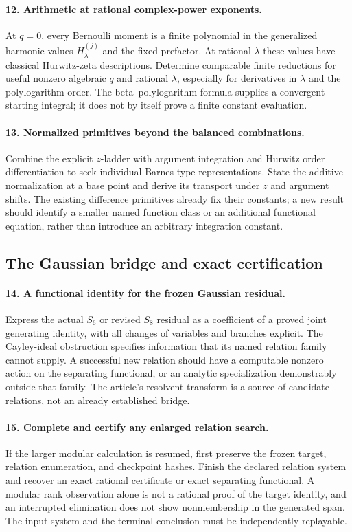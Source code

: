 \paragraph{12. Arithmetic at rational complex-power exponents.}
At $q=0$, every Bernoulli moment is a finite polynomial in the
generalized harmonic values $H_\lambda^{(j)}$ and the fixed
prefactor. At rational $\lambda$ these values have classical
Hurwitz-zeta descriptions. Determine comparable finite reductions
for useful nonzero algebraic $q$ and rational $\lambda$, especially
for derivatives in $\lambda$ and the polylogarithm order.
The beta--polylogarithm formula supplies a convergent starting
integral; it does not by itself prove a finite constant evaluation.

\paragraph{13. Normalized primitives beyond the balanced combinations.}
Combine the explicit $z$-ladder with argument integration and
Hurwitz order differentiation to seek individual Barnes-type
representations. State the additive normalization at a base point
and derive its transport under $z$ and argument shifts. The
existing difference primitives already fix their constants; a
new result should identify a smaller named function class or an
additional functional equation, rather than introduce an arbitrary
integration constant.

\subsection{The Gaussian bridge and exact certification}

\paragraph{14. A functional identity for the frozen Gaussian residual.}
Express the actual $S_6$ or revised $S_8$ residual as a coefficient
of a proved joint generating identity, with all changes of
variables and branches explicit. The Cayley-ideal obstruction
specifies information that its named relation family cannot
supply. A successful new relation should have a computable
nonzero action on the separating functional, or an analytic
specialization demonstrably outside that family. The article's
resolvent transform is a source of candidate relations, not an
already established bridge.

\paragraph{15. Complete and certify any enlarged relation search.}
If the larger modular calculation is resumed, first preserve the
frozen target, relation enumeration, and checkpoint hashes. Finish
the declared relation system and recover an exact rational
certificate or exact separating functional. A modular rank
observation alone is not a rational proof of the target identity,
and an interrupted elimination does not show nonmembership in
the generated span. The input system and the terminal conclusion
must be independently replayable.

